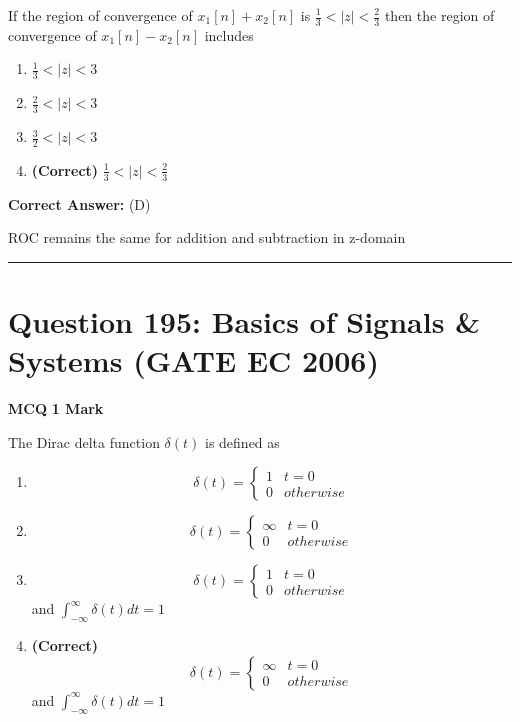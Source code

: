 \documentclass[11pt,a4paper]{article}
\begin{document}
\noindent If the region of convergence of $x_{1}[n]+x_{2}[n]$ is $\frac{1}{3} < |z| < \frac{2}{3}$ then the region of
convergence of $x_{1}[n]- x_{2}[n]$  includes


\begin{enumerate}[label=(\Alph*)]
    \item $\frac{1}{3} < |z| < 3$
    \item $\frac{2}{3} < |z| < 3$
    \item $\frac{3}{2} < |z| < 3$
    \item \textbf{(Correct)} $\frac{1}{3} < |z| < \frac{2}{3}$
\end{enumerate}

\noindent \textbf{Correct Answer:} (D)

\begin{tcolorbox}[solbox, title=Detailed Solution -- Question 194]
ROC remains the same for addition and subtraction
in z-domain
\end{tcolorbox}

\vspace{1.5em}
\hrule
\vspace{1.5em}

\section*{Question 195: Basics of Signals \& Systems (GATE EC 2006)}
\noindent \textbf{\color{primary}MCQ} \hfill \textbf{\color{secondary}1 Mark}


\noindent The Dirac delta function $\delta (t)$ is defined as


\begin{enumerate}[label=(\Alph*)]
    \item \[
\delta (t)=\left\{\begin{matrix} 1 &t=0 \\ 0&otherwise \end{matrix}\right.
\]
    \item \[
\delta (t)=\left\{\begin{matrix} \infty &t=0 \\ 0&otherwise \end{matrix}\right.
\]
    \item \[
\delta (t)=\left\{\begin{matrix} 1 &t=0 \\ 0&otherwise \end{matrix}\right.
\]
 and $\int_{-\infty }^{\infty }\delta (t)dt=1$
    \item \textbf{(Correct)} \[
\delta (t)=\left\{\begin{matrix} \infty &t=0 \\ 0&otherwise \end{matrix}\right.
\]
 and $\int_{-\infty }^{\infty }\delta (t)dt=1$
\end{enumerate}
\end{document}
